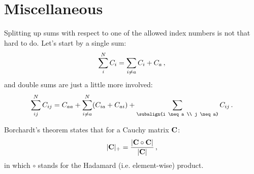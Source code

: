 \section{Miscellaneous}
    Splitting up sums with respect to one of the allowed index numbers is not that hard to do. Let's start by a single sum:
    \begin{equation}
        \sum_i^N C_i = \sum_{i \neq a} C_i + C_a \thinspace ,
    \end{equation}
    and double sums are just a little more involved:
    \begin{equation}
        \sum_{ij}^N C_{ij} = C_{aa}+ \sum_{i \neq a}^N (C_{ia} + C_{ai}) + \sum_{\subalign{i \neq a \\ j \neq a}} C_{ij} \thinspace .
    \end{equation}

    Borchardt's theorem states that for a Cauchy matrix $\vb{C}$:
    \begin{equation}
        |\vb{C}|_+ = \frac{|\vb{C} \circ \vb{C}|}{|\vb{C}|} \thinspace ,
    \end{equation}
    in which $\circ$ stands for the Hadamard (i.e. element-wise) product.
